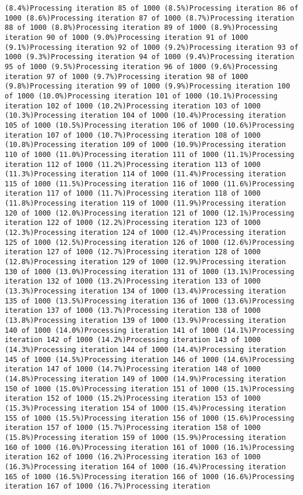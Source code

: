 \documentclass[
]{article}
\begin{document}
\begin{verbatim}
(8.4%)Processing iteration 85 of 1000 (8.5%)Processing iteration 86 of 1000 (8.6%)Processing iteration 87 of 1000 (8.7%)Processing iteration 88 of 1000 (8.8%)Processing iteration 89 of 1000 (8.9%)Processing iteration 90 of 1000 (9.0%)Processing iteration 91 of 1000 (9.1%)Processing iteration 92 of 1000 (9.2%)Processing iteration 93 of 1000 (9.3%)Processing iteration 94 of 1000 (9.4%)Processing iteration 95 of 1000 (9.5%)Processing iteration 96 of 1000 (9.6%)Processing iteration 97 of 1000 (9.7%)Processing iteration 98 of 1000 (9.8%)Processing iteration 99 of 1000 (9.9%)Processing iteration 100 of 1000 (10.0%)Processing iteration 101 of 1000 (10.1%)Processing iteration 102 of 1000 (10.2%)Processing iteration 103 of 1000 (10.3%)Processing iteration 104 of 1000 (10.4%)Processing iteration 105 of 1000 (10.5%)Processing iteration 106 of 1000 (10.6%)Processing iteration 107 of 1000 (10.7%)Processing iteration 108 of 1000 (10.8%)Processing iteration 109 of 1000 (10.9%)Processing iteration 110 of 1000 (11.0%)Processing iteration 111 of 1000 (11.1%)Processing iteration 112 of 1000 (11.2%)Processing iteration 113 of 1000 (11.3%)Processing iteration 114 of 1000 (11.4%)Processing iteration 115 of 1000 (11.5%)Processing iteration 116 of 1000 (11.6%)Processing iteration 117 of 1000 (11.7%)Processing iteration 118 of 1000 (11.8%)Processing iteration 119 of 1000 (11.9%)Processing iteration 120 of 1000 (12.0%)Processing iteration 121 of 1000 (12.1%)Processing iteration 122 of 1000 (12.2%)Processing iteration 123 of 1000 (12.3%)Processing iteration 124 of 1000 (12.4%)Processing iteration 125 of 1000 (12.5%)Processing iteration 126 of 1000 (12.6%)Processing iteration 127 of 1000 (12.7%)Processing iteration 128 of 1000 (12.8%)Processing iteration 129 of 1000 (12.9%)Processing iteration 130 of 1000 (13.0%)Processing iteration 131 of 1000 (13.1%)Processing iteration 132 of 1000 (13.2%)Processing iteration 133 of 1000 (13.3%)Processing iteration 134 of 1000 (13.4%)Processing iteration 135 of 1000 (13.5%)Processing iteration 136 of 1000 (13.6%)Processing iteration 137 of 1000 (13.7%)Processing iteration 138 of 1000 (13.8%)Processing iteration 139 of 1000 (13.9%)Processing iteration 140 of 1000 (14.0%)Processing iteration 141 of 1000 (14.1%)Processing iteration 142 of 1000 (14.2%)Processing iteration 143 of 1000 (14.3%)Processing iteration 144 of 1000 (14.4%)Processing iteration 145 of 1000 (14.5%)Processing iteration 146 of 1000 (14.6%)Processing iteration 147 of 1000 (14.7%)Processing iteration 148 of 1000 (14.8%)Processing iteration 149 of 1000 (14.9%)Processing iteration 150 of 1000 (15.0%)Processing iteration 151 of 1000 (15.1%)Processing iteration 152 of 1000 (15.2%)Processing iteration 153 of 1000 (15.3%)Processing iteration 154 of 1000 (15.4%)Processing iteration 155 of 1000 (15.5%)Processing iteration 156 of 1000 (15.6%)Processing iteration 157 of 1000 (15.7%)Processing iteration 158 of 1000 (15.8%)Processing iteration 159 of 1000 (15.9%)Processing iteration 160 of 1000 (16.0%)Processing iteration 161 of 1000 (16.1%)Processing iteration 162 of 1000 (16.2%)Processing iteration 163 of 1000 (16.3%)Processing iteration 164 of 1000 (16.4%)Processing iteration 165 of 1000 (16.5%)Processing iteration 166 of 1000 (16.6%)Processing iteration 167 of 1000 (16.7%)Processing iteration 
\end{verbatim}
\end{document}
